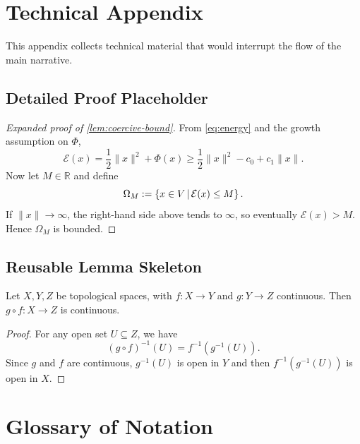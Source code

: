 \appendix

\section{Technical Appendix}
\label{sec:technical-appendix}

This appendix collects technical material that would interrupt the flow of the main narrative.

\subsection{Detailed Proof Placeholder}
\label{app:proof-coercive-bound}

\begin{proof}[Expanded proof of \cref{lem:coercive-bound}]
From \cref{eq:energy} and the growth assumption on $\Phi$,
\[
\mathcal{E}(x)=\frac12\|x\|^2+\Phi(x)
\ge \frac12\|x\|^2-c_0+c_1\|x\|.
\]
Now let $M\in\mathbb{R}$ and define
\[
\Omega_M:=\left\{x\in V\,|\,\mathcal{E}(x)\le M\right\}.
\]
If $\|x\|\to\infty$, the right-hand side above tends to $\infty$, so eventually $\mathcal{E}(x)>M$. Hence $\Omega_M$ is bounded.
\end{proof}

\subsection{Reusable Lemma Skeleton}
\label{app:lemma-skeleton}

\begin{lemma}
\label{lem:composition-template}
Let $X,Y,Z$ be topological spaces, with $f:X\to Y$ and $g:Y\to Z$ continuous. Then $g\circ f:X\to Z$ is continuous.
\end{lemma}

\begin{proof}
For any open set $U\subseteq Z$, we have
\[
(g\circ f)^{-1}(U)=f^{-1}(g^{-1}(U)).
\]
Since $g$ and $f$ are continuous, $g^{-1}(U)$ is open in $Y$ and then $f^{-1}(g^{-1}(U))$ is open in $X$.
\end{proof}


\section{Glossary of Notation}
\label{sec:notation-appendix}

